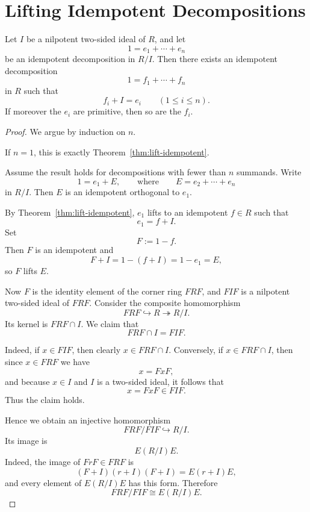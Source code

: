 \section{Lifting Idempotent Decompositions}

\begin{corollary}
    Let $I$ be a nilpotent two-sided ideal of $R$, and let
    \[
        1=e_1+\cdots+e_n
    \]
    be an idempotent decomposition in $R/I$. Then there exists an idempotent decomposition
    \[
        1=f_1+\cdots+f_n
    \]
    in $R$ such that
    \[
        f_i+I=e_i
        \qquad (1\le i\le n).
    \]
    If moreover the $e_i$ are primitive, then so are the $f_i$.
\end{corollary}

\begin{proof}
    We argue by induction on $n$.

    If $n=1$, this is exactly Theorem~\ref{thm:lift-idempotent}.

    Assume the result holds for decompositions with fewer than $n$ summands. Write
    \[
        1=e_1+E,
        \qquad\text{where}\qquad
        E=e_2+\cdots+e_n
    \]
    in $R/I$. Then $E$ is an idempotent orthogonal to $e_1$.

    By Theorem~\ref{thm:lift-idempotent}, $e_1$ lifts to an idempotent $f\in R$ such that
    \[
        e_1=f+I.
    \]
    Set
    \[
        F:=1-f.
    \]
    Then $F$ is an idempotent and
    \[
        F+I=1-(f+I)=1-e_1=E,
    \]
    so $F$ lifts $E$.

    Now $F$ is the identity element of the corner ring $FRF$, and $FIF$ is a nilpotent
    two-sided ideal of $FRF$. Consider the composite homomorphism
    \[
        FRF \hookrightarrow R \twoheadrightarrow R/I.
    \]
    Its kernel is $FRF\cap I$. We claim that
    \[
        FRF\cap I=FIF.
    \]

    Indeed, if $x\in FIF$, then clearly $x\in FRF\cap I$. Conversely, if $x\in FRF\cap I$,
    then since $x\in FRF$ we have
    \[
        x=FxF,
    \]
    and because $x\in I$ and $I$ is a two-sided ideal, it follows that
    \[
        x=FxF\in FIF.
    \]
    Thus the claim holds.

    Hence we obtain an injective homomorphism
    \[
        FRF/FIF \hookrightarrow R/I.
    \]
    Its image is
    \[
        E(R/I)E.
    \]
    Indeed, the image of $FrF\in FRF$ is
    \[
        (F+I)(r+I)(F+I)=E(r+I)E,
    \]
    and every element of $E(R/I)E$ has this form. Therefore
    \[
        FRF/FIF \cong E(R/I)E.
    \]


\end{proof}
